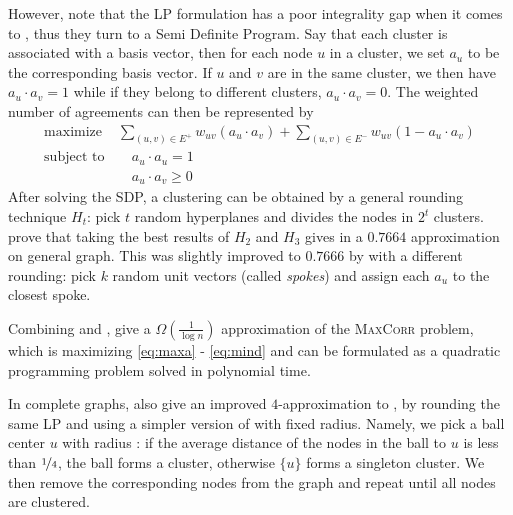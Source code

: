 However, \textcite[Theorem 2]{Charikar2003} note that the LP formulation has a poor integrality gap
when it comes to \maxa{}, thus they turn to a Semi Definite Program. Say that each cluster is
associated with a basis vector, then for each node $u$ in a cluster, we set $a_u$ to be the
corresponding basis vector. If $u$ and $v$ are in the same cluster, we then have $a_u\cdot a_v = 1$
while if they belong to different clusters, $a_u\cdot a_v = 0$. The weighted number of agreements
can then be represented by
\begin{align}
   \label{eq:maxaSDP}
   \text{maximize } & \sum_{(u,v)\in E^+} w_{uv}(a_u\cdot a_v) + \sum_{(u,v)\in E^-} w_{uv}(1-a_u\cdot a_v) \\
   \text{subject to}& \quad a_u\cdot a_u=1 \nonumber\\
   \phantom{subject to}& \quad a_u\cdot a_v\geq 0  \nonumber
\end{align}
After solving the SDP, a clustering can be obtained by a general rounding technique $H_t$: pick $t$
random hyperplanes and divides the nodes in $2^t$ clusters. \Textcite[Theorem 3]{Charikar2003} prove
that taking the best results of $H_2$ and $H_3$ gives in a $0.7664$ approximation on general graph.
This was slightly improved to $0.7666$ by \textcite{Swamy2004} with a different rounding: pick $k$
random unit vectors (called \emph{spokes}) and assign each $a_u$ to the closest spoke.

Combining \mind{} and \maxa{}, \textcite[Section 4]{Charikar2004} give a $\Omega(\frac{1}{\log n})$
approximation of the \textsc{MaxCorr} problem, which is maximizing \eqref{eq:maxa} - \eqref{eq:mind}
and can be formulated as a quadratic programming problem solved in polynomial time.

In complete graphs, \textcite[Section 3]{Charikar2003} also give an improved $4$-approximation to
\mind{}, by rounding the same LP and using a simpler version of \regionGrow{} with fixed radius.
Namely, we pick a ball center $u$ \uar{} with radius \shalf{}: if the average distance of the nodes
in the ball to $u$ is less than $\nicefrac{1}{4}$, the ball forms a cluster, otherwise $\{u\}$ forms
a singleton cluster. We then remove the corresponding nodes from the graph and repeat until all
nodes are clustered.

